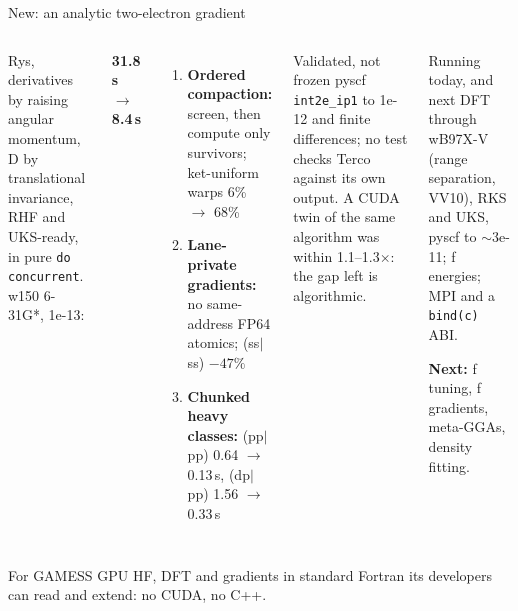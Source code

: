 \documentclass[aspectratio=169]{beamer}
\newcommand{\bignum}[2][fortranPurple]{{\fontsize{30}{32}\selectfont\bfseries\color{#1}#2}}
\begin{document}
\begin{frame}{New: an analytic two-electron gradient}
  \vspace{-.4em}
  \begin{columns}[T,onlytextwidth]
      {\footnotesize Rys, derivatives by raising angular momentum, D by translational invariance, RHF and UKS-ready, in pure \texttt{do concurrent}. w150 6-31G*, 1e-13:}\par
      \bignum{31.8\,s $\rightarrow$ 8.4\,s}\par
      \begin{enumerate}\setlength\itemsep{1pt}\footnotesize
        \item \textbf{Ordered compaction:} screen, then compute only survivors; ket-uniform warps 6\% $\rightarrow$ 68\%
        \item \textbf{Lane-private gradients:} no same-address FP64 atomics; (ss$|$ss) $-47\%$
        \item \textbf{Chunked heavy classes:} (pp$|$pp) 0.64 $\rightarrow$ 0.13\,s, (dp$|$pp) 1.56 $\rightarrow$ 0.33\,s
      \end{enumerate}
      \begin{block}{Validated, not frozen}
        \footnotesize pyscf \texttt{int2e\_ip1} to 1e-12 and finite differences; no test checks Terco against its own output. A CUDA twin of the same algorithm was within 1.1--1.3$\times$: the gap left is algorithmic.
      \end{block}
      \begin{block}{Running today, and next}
        \footnotesize DFT through wB97X-V (range separation, VV10), RKS and UKS, pyscf to $\sim$3e-11; f energies; MPI and a \texttt{bind(c)} ABI.\par\smallskip
        \textbf{Next:} f tuning, f gradients, meta-GGAs, density fitting.
      \end{block}
  \end{columns}
  \begin{alertblock}{For GAMESS}
    \small GPU HF, DFT and gradients in standard Fortran its developers can read and extend: no CUDA, no C++.
  \end{alertblock}
\end{frame}
\end{document}
